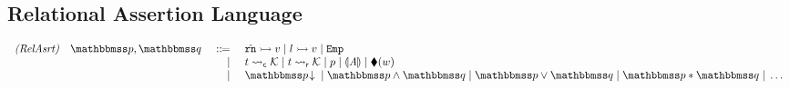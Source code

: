 \subsection{Relational Assertion Language}
\label{subsec:rel-assertion}
\vspace*{-1em}
\begin{center}
    \[
        \begin{array}{rcl}
            \textit{(RelAsrt)} \quad \relastP, \relastQ & \ \define \ & 
            \hregsto{\hrn}{\val} \sepline 
            \hmsto{\loc}{\val} \sepline
            \empAst \\
            & \ \ \ | &
            \astCurCont{\thrdid}{\hthrdlocalst} \sepline 
            \astRdyCont{\thrdid}{\hthrdlocalst} \sepline
            \astP \sepline \safePrimAst{\primcom} \sepline 
            \metricAst{\word} \\
            & \ \ \ | & 
            \nxtAst{\relastP} \sepline 
            \relastP \land \relastQ \sepline
            \relastP \lor \relastQ \sepline
            \relastP \sepstar \relastQ \sepline \dots 
        \end{array} 
    \]
    \label{fig:Syntax of Relational Assertion}
\end{center}


